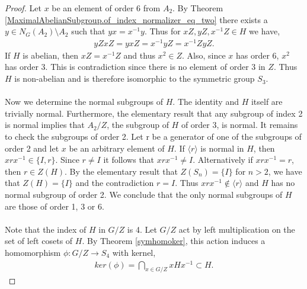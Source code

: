 \begin{proof}
Let $x$ be an element of order 6 from $A_2$. By Theorem \ref{MaximalAbelianSubgroup.of_index_normalizer_eq_two} there exists a $y \in N_G(A_2) \! \setminus \! A_2$ such that $y x = x^{-1} y$. Thus for $xZ, yZ, x^{-1}Z \in H$ we have,
\begin{align*} yZ xZ = yxZ =  x^{-1}yZ = x^{-1}Z yZ.
\end{align*}
If $H$ is abelian, then $xZ = x^{-1}Z$ and thus $x^2 \in Z$. Also, since $x$ has order 6, $x^2$ has order 3. This is contradiction since there is no element of order 3 in $Z$. Thus $H$ is non-abelian and is therefore isomorphic to the symmetric group $S_3$. \\
\\
Now we determine the normal subgroups of $H$. The identity and $H$ itself are trivially normal. Furthermore, the elementary result that any subgroup of index 2 is normal implies that $A_2 / Z$, the subgroup of $H$ of order 3, is normal. It remains to check the subgroups of order 2. Let r be a generator of one of the subgroups of order 2 and let $x$ be an arbitrary element of $H$. If $\langle r \rangle$ is normal in $H$, then $x r x^{-1} \in \{ I , r \}$. Since $r \neq I$ it follows that $x r x^{-1} \neq I$. Alternatively if $x r x^{-1} = r$, then $r \in Z(H)$. By the elementary result that $Z(S_n) = \{ I \}$ for $n > 2$, we have that $Z(H) = \{ I \}$ and the contradiction $r=I$. Thus $x r x^{-1} \not \in \langle r \rangle$ and $H$ has no normal subgroup of order 2. We conclude that the only normal subgroups of $H$ are those of order 1, 3 or 6. \\
\\
Note that the index of $H$ in $G / Z$ is 4. Let $G / Z$ act by left multiplication on the set of left cosets of $H$. By Theorem \ref{symhomoker}, this action induces a homomorphism $\phi : G / Z \longrightarrow S_4$ with kernel,
\begin{align*} ker(\phi) = \bigcap\limits_{x \in G / Z} x H x^{-1}  \subset H.
\end{align*}


\end{proof}
